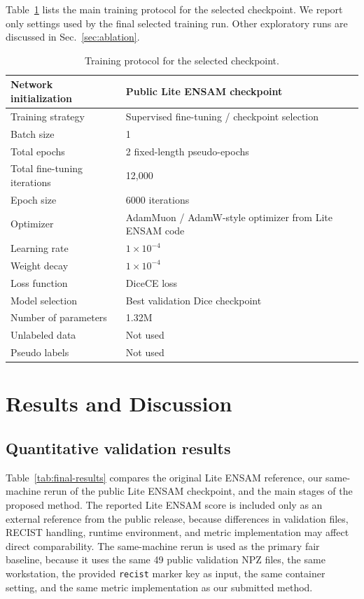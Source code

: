 \documentclass[runningheads]{llncs}
\begin{document}
Table~\ref{table:training} lists the main training protocol for the selected checkpoint. We report only settings used by the final selected training run. Other exploratory runs are discussed in Sec.~\ref{sec:ablation}.

\begin{table}[!htbp]
\caption{Training protocol for the selected checkpoint.}
\label{table:training}
\centering
\begin{tabular}{ll}
\hline
Network initialization & Public Lite ENSAM checkpoint \\
\hline
Training strategy & Supervised fine-tuning / checkpoint selection \\
\hline
Batch size & 1 \\
\hline
Total epochs & 2 fixed-length pseudo-epochs \\
\hline
Total fine-tuning iterations & 12,000 \\
\hline
Epoch size & 6000 iterations \\
\hline
Optimizer & AdamMuon / AdamW-style optimizer from Lite ENSAM code \\
\hline
Learning rate & $1\times 10^{-4}$ \\
\hline
Weight decay & $1\times 10^{-4}$ \\
\hline
Loss function & DiceCE loss \\
\hline
Model selection & Best validation Dice checkpoint \\
\hline
Number of parameters & 1.32M \\
\hline
Unlabeled data & Not used \\
\hline
Pseudo labels & Not used \\
\hline
\end{tabular}
\end{table}

\section{Results and Discussion}
\label{sec:results}

\subsection{Quantitative validation results}
\label{sec:quantitative}

Table~\ref{tab:final-results} compares the original Lite ENSAM reference, our same-machine rerun of the public Lite ENSAM checkpoint, and the main stages of the proposed method. The reported Lite ENSAM score is included only as an external reference from the public release, because differences in validation files, RECIST handling, runtime environment, and metric implementation may affect direct comparability. The same-machine rerun is used as the primary fair baseline, because it uses the same 49 public validation NPZ files, the same workstation, the provided \texttt{recist} marker key as input, the same container setting, and the same metric implementation as our submitted method.
\end{document}
